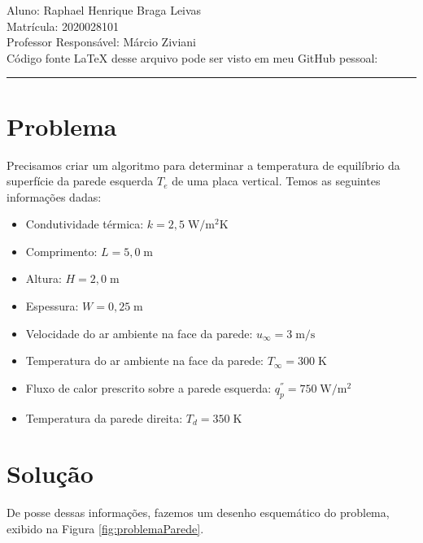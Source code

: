 \documentclass[12pt]{scrartcl}
\newcommand{\un}[1]{\;\textrm{#1}}
\begin{document}

\pagestyle{fancy}

\fancyhead{}
\fancyfoot{}

\begin{center}
    Aluno: Raphael Henrique Braga Leivas \\
    Matrícula: 2020028101 \\
    Professor Responsável: Márcio Ziviani \\[20pt]

    Código fonte LaTeX desse arquivo pode ser visto em meu GitHub pessoal:
\end{center}

\hrule

\section{Problema}

Precisamos criar um algoritmo para determinar a temperatura de equilíbrio da superfície
da parede esquerda $T_e$ de uma placa vertical. Temos as seguintes informações dadas:

\begin{itemize}
    \item Condutividade térmica: $k=2,5 \un{W/m$^2$K}$
    \item Comprimento: $L=5,0 \un{m}$
    \item Altura: $H=2,0 \un{m}$
    \item Espessura: $W=0,25 \un{m}$
    \item Velocidade do ar ambiente na face da parede: $u_{\infty}=3 \un{m/s}$
    \item Temperatura do ar ambiente na face da parede: $T_{\infty}=300 \un{K}$
    \item Fluxo de calor prescrito sobre a parede esquerda: $q_{p}^{''}=750 \un{W/m$^2$}$
    \item Temperatura da parede direita: $T_d=350 \un{K}$
\end{itemize}

\section{Solução}

De posse dessas informações, fazemos um desenho esquemático do problema, exibido na   
Figura \ref{fig:problemaParede}. 
\end{document}
